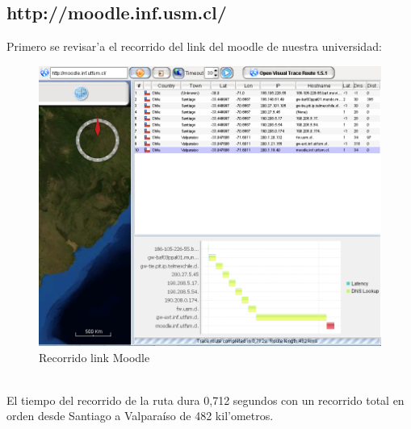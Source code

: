 \documentclass{article}
\begin{document}
\subsection{http://moodle.inf.usm.cl/}
Primero se revisar'a el recorrido del link del moodle de nuestra universidad:
\\
\begin{figure}[H]
  \centering
    \includegraphics[width=1.0\textwidth]{ruta1_moodle}
  \caption{Recorrido link Moodle}
  \label{moodle}
\end{figure}\\

El tiempo del recorrido de la ruta dura 0,712 segundos con un recorrido total en orden desde Santiago a Valparaíso de 482 kil'ometros.
\end{document}
